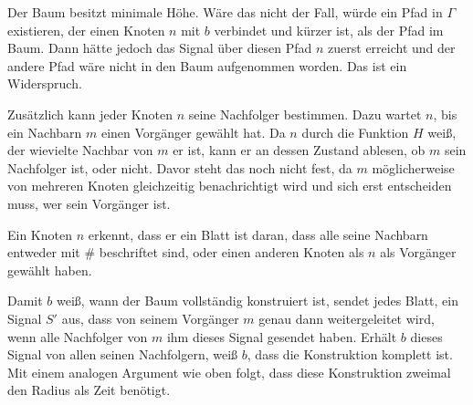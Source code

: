 \documentclass[11pt]{article}
\begin{document}
Der Baum besitzt minimale Höhe. 
Wäre das nicht der Fall, würde ein Pfad in $\Gamma$ existieren, der einen Knoten $n$ mit $b$ verbindet und kürzer ist, als der Pfad im Baum. 
Dann hätte jedoch das Signal über diesen Pfad $n$ zuerst erreicht und der andere Pfad wäre nicht in den Baum aufgenommen worden. 
Das ist ein Widerspruch.

Zusätzlich kann jeder Knoten $n$ seine Nachfolger bestimmen. 
Dazu wartet $n$, bis ein Nachbarn $m$ einen Vorgänger gewählt hat.
Da $n$ durch die Funktion $H$ weiß, der wievielte Nachbar von $m$ er ist, kann er an dessen Zustand ablesen, ob $m$ sein Nachfolger ist, oder nicht. 
Davor steht das noch nicht fest, da $m$ möglicherweise von mehreren Knoten gleichzeitig benachrichtigt wird und sich erst entscheiden muss, wer sein Vorgänger ist.

Ein Knoten $n$ erkennt, dass er ein Blatt ist daran, dass alle seine Nachbarn entweder mit $\#$ beschriftet sind, oder einen anderen Knoten als $n$ als Vorgänger gewählt haben.

Damit $b$ weiß, wann der Baum vollständig konstruiert ist, sendet jedes Blatt, ein Signal $S'$ aus, dass von seinem Vorgänger $m$ genau dann weitergeleitet wird, wenn alle Nachfolger von $m$ ihm dieses Signal gesendet haben. 
Erhält $b$ dieses Signal von allen seinen Nachfolgern, weiß $b$, dass die Konstruktion komplett ist.
Mit einem analogen Argument wie oben folgt, dass diese Konstruktion zweimal den Radius als Zeit benötigt.

\end{document}
